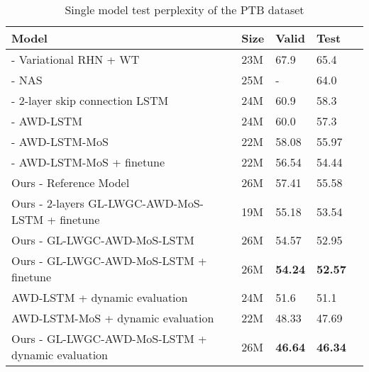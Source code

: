 \documentclass{article}
\begin{document}
\begin{table}[!ht] 
  \caption{Single model test perplexity of the PTB dataset}
  \centering
  \begin{tabular}{lllll}
    \toprule
    \textbf{Model}	& \textbf{Size} 	& \textbf{Valid} & \textbf{Test} \\
    \toprule
    
    \citet{RHN} - Variational RHN + WT 		 						    & 23M & 67.9 & 65.4 \\
    \citet{NAS} - NAS & 25M & - & 64.0 \\
    \citet{melis2017state} - 2-layer skip connection LSTM & 24M &  60.9 & 58.3 \\
    \citet{Regularizing_Optimizing_LSTM_LM} - AWD-LSTM                  & 24M & 60.0 & 57.3 \\
    \citet{mos} - AWD-LSTM-MoS & 22M & 58.08 & 55.97\\
    \citet{mos} - AWD-LSTM-MoS + finetune & 22M & 56.54 & 54.44\\
    \midrule
    Ours - Reference Model         & 26M &  57.41       & 55.58 \\
Ours - 2-layers GL-LWGC-AWD-MoS-LSTM + finetune & 19M & 55.18 & 53.54\\
    Ours - GL-LWGC-AWD-MoS-LSTM & 26M & 54.57 & 52.95 \\
    Ours - GL-LWGC-AWD-MoS-LSTM + finetune & 26M & \textbf{54.24} & \textbf{52.57} \\
    \midrule
    \citet{dynamicEval} AWD-LSTM + dynamic evaluation\footnote[2] & 24M & 51.6 & 51.1 \\
    \citet{mos} AWD-LSTM-MoS + dynamic evaluation\footnote[2] & 22M & 48.33 & 47.69 \\
    Ours - GL-LWGC-AWD-MoS-LSTM + dynamic evaluation\footnote[2] & 26M & \textbf{46.64} & \textbf{46.34} \\
    \bottomrule
  \end{tabular}
  \label{res_table}
\end{table}
\end{document}
